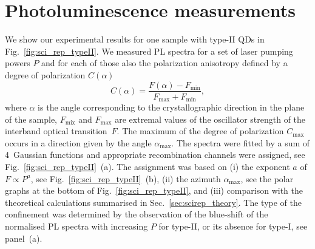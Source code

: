 \section{Photoluminescence measurements}
%
We show our experimental results for one sample with type-II QDs in Fig.~\ref{fig:sci_rep_typeII}. We measured PL spectra for a set of laser pumping powers $P$ and for each of those also the polarization anisotropy defined by a degree of polarization $C(\alpha)$
\begin{equation}
C(\alpha)=\frac{F(\alpha)-F_\mathrm{min}}{F_\mathrm{max}+F_\mathrm{min}},
\end{equation}
where $\alpha$ is the angle corresponding to the crystallographic direction in the plane of the sample, $F_\mathrm{mix}$ and $F_\mathrm{max}$ are extremal values of the oscillator strength of the interband optical transition~$F$. The maximum of the degree of polarization $C_\mathrm{max}$ occurs in a direction given by the angle $\alpha_\mathrm{max}$. The spectra were fitted by a sum of 4~Gaussian functions and appropriate recombination channels were assigned, see Fig.~\ref{fig:sci_rep_typeII}~(a). The assignment was based on (i) the exponent $a$ of $F\propto P^a$, see Fig.~\ref{fig:sci_rep_typeII}~(b), (ii) the azimuth $\alpha_\mathrm{max}$, see the polar graphs at the bottom of Fig.~\ref{fig:sci_rep_typeII}, and (iii) comparison with the theoretical calculations summarised in Sec.~\ref{sec:scirep_theory}. The type of the confinement was determined by the observation of the blue-shift of the normalised PL spectra with increasing $P$ for type-II, or its absence for type-I, see panel~(a).

